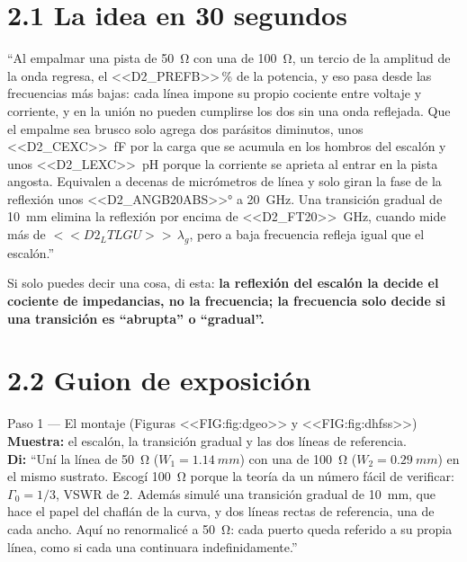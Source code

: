 \documentclass[11pt,letterpaper]{article}
\begin{document}
\section*{2.1 La idea en 30 segundos}
\begin{idea}
``Al empalmar una pista de \SI{50}{\ohm} con una de \SI{100}{\ohm}, un tercio de la amplitud de la onda regresa, el <<D2_PREFB>>\,\% de la potencia, y eso pasa desde las frecuencias más bajas: cada línea impone su propio cociente entre voltaje y corriente, y en la unión no pueden cumplirse los dos sin una onda reflejada. Que el empalme sea brusco solo agrega dos parásitos diminutos, unos \SI{<<D2_CEXC>>}{fF} por la carga que se acumula en los hombros del escalón y unos \SI{<<D2_LEXC>>}{pH} porque la corriente se aprieta al entrar en la pista angosta. Equivalen a decenas de micrómetros de línea y solo giran la fase de la reflexión unos \ang{<<D2_ANGB20ABS>>} a \SI{20}{GHz}. Una transición gradual de \SI{10}{mm} elimina la reflexión por encima de \SI{<<D2_FT20>>}{GHz}, cuando mide más de $<<D2_LTLGU>>\,\lambda_g$, pero a baja frecuencia refleja igual que el escalón.''
\end{idea}

Si solo puedes decir una cosa, di esta: \textbf{la reflexión del escalón la decide el cociente de impedancias, no la frecuencia; la frecuencia solo decide si una transición es ``abrupta'' o ``gradual''.}

\section*{2.2 Guion de exposición}

\begin{paso}{Paso 1 --- El montaje (Figuras <<FIG:fig:dgeo>> y <<FIG:fig:dhfss>>)}
\textbf{Muestra:} el escalón, la transición gradual y las dos líneas de referencia.\\
\textbf{Di:} ``Uní la línea de \SI{50}{\ohm} ($W_1=\SI{1.14}{mm}$) con una de \SI{100}{\ohm} ($W_2=\SI{0.29}{mm}$) en el mismo sustrato. Escogí \SI{100}{\ohm} porque la teoría da un número fácil de verificar: $\Gamma_0=1/3$, VSWR de 2. Además simulé una transición gradual de \SI{10}{mm}, que hace el papel del chaflán de la curva, y dos líneas rectas de referencia, una de cada ancho. Aquí no renormalicé a \SI{50}{\ohm}: cada puerto queda referido a su propia línea, como si cada una continuara indefinidamente.''
\end{paso}
\end{document}
